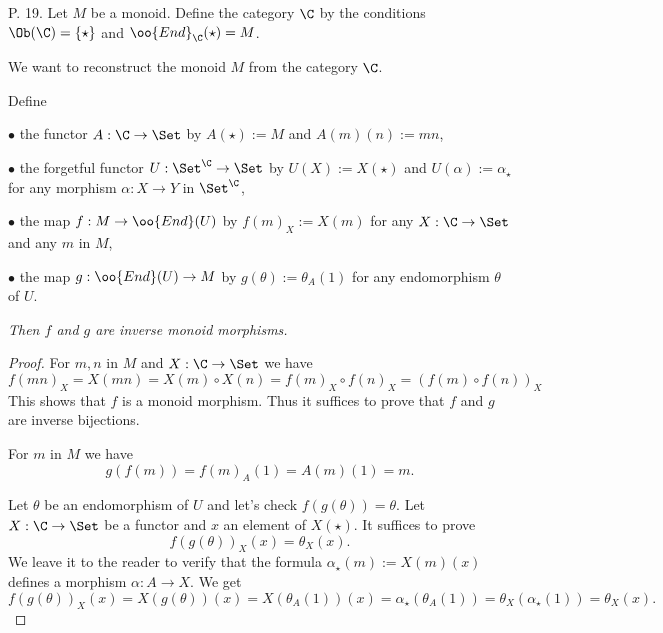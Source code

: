 \documentclass[12pt]{article}
\theoremstyle{remark}
\theoremstyle{definition}
\begin{document}
\begin{s}%
P. 19. Let $M$ be a monoid. Define the category $\C$ by the conditions $\Ob(\C)=\{\star\}$ and $\oo{End}_\C(\star)=M$.

We want to reconstruct the monoid $M$ from the category $\C$.

Define 

\nn$\bullet$ the functor $A:\C\to\Set$ by $A(\star):=M$ and $A(m)(n):=mn$, 

\nn$\bullet$ the forgetful functor $U:\Set^\C\to\Set$ by $U(X):=X(\star)$ and $U(\alpha):=\alpha_\star$ for any morphism $\alpha:X\to Y$ in $\Set^\C$,

\nn$\bullet$ the map $f:M\to\oo{End}(U)$ by $f(m)_X:=X(m)$ for any $X:\C\to\Set$ and any $m$ in $M$,%

\nn$\bullet$ the map $g:\oo{End}(U)\to M$ by $g(\theta):=\theta_A(1)$ for any endomorphism $\theta$ of $U$.

\emph{Then $f$ and $g$ are inverse monoid morphisms.}

\begin{proof} For $m,n$ in $M$ and $X:\C\to\Set$ we have 
$$
f(mn)_X=X(mn)=X(m)\circ X(n)=f(m)_X\circ f(n)_X=(f(m)\circ f(n))_X
$$ 
This shows that $f$ is a monoid morphism. Thus it suffices to prove that $f$ and $g$ are inverse bijections.

For $m$ in $M$ we have 
$$
g(f(m))=f(m)_A(1)=A(m)(1)=m.
$$

Let $\theta$ be an endomorphism of $U$ and let's check $f(g(\theta))=\theta$. Let $X:\C\to\Set$ be a functor and $x$ an element of $X(\star)$. It suffices to prove 
$$
f(g(\theta))_X(x)=\theta_X(x).
$$ 
We leave it to the reader to verify that the formula $\alpha_\star(m):=X(m)(x)$ defines a morphism $\alpha:A\to X$. We get 
$$
f(g(\theta))_X(x)=X(g(\theta))(x)=X(\theta_A(1))(x)=\alpha_\star(\theta_A(1))=\theta_X(\alpha_\star(1))=\theta_X(x).
$$ 
\end{proof}
\end{s}

%
\end{document}
